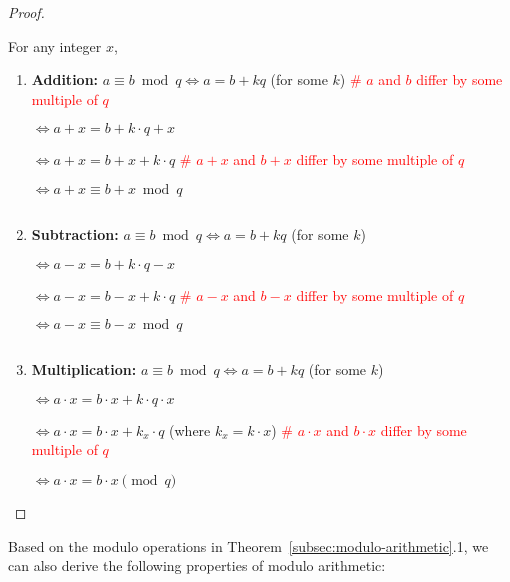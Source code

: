 \begin{proof}

$ $

For any integer $x$,

\begin{enumerate}


\item \textbf{Addition:} $a \equiv b \bmod q \Longleftrightarrow a = b + k q $ (for some $k$) \textcolor{red}{ \text{ } \# $a$ and $b$ differ by some multiple of $q$}

$\Longleftrightarrow a + x = b + k\cdot q + x$

$\Longleftrightarrow a + x = b + x + k\cdot q$ \textcolor{red}{ \text{ }  \# $a+x$ and $b+x$ differ by some multiple of $q$}

$\Longleftrightarrow a + x \equiv b + x \bmod q$

$ $

\item \textbf{Subtraction:} $a \equiv b \bmod q \Longleftrightarrow a = b + k q $ (for some $k$)

$\Longleftrightarrow a - x = b + k\cdot q - x$

$\Longleftrightarrow a - x = b - x + k\cdot q$  \textcolor{red}{ \text{ }  \# $a-x$ and $b-x$ differ by some multiple of $q$}

$\Longleftrightarrow a - x \equiv b - x \bmod q$

$ $

\item \textbf{Multiplication:} $a \equiv b \bmod q \Longleftrightarrow a = b + k q $ (for some $k$)

$\Longleftrightarrow a \cdot x = b \cdot x + k\cdot q \cdot x$

$\Longleftrightarrow a \cdot x = b \cdot x + k_x\cdot q$ (where $k_x = k \cdot x$)  \textcolor{red}{ \text{ }  \# $a\cdot x$ and $b\cdot x$ differ by some multiple of $q$}

$\Longleftrightarrow a \cdot x = b \cdot x \pmod q$

\end{enumerate}
\end{proof}

Based on the modulo operations in Theorem~\ref*{subsec:modulo-arithmetic}.1, we can also derive the following properties of modulo arithmetic:


